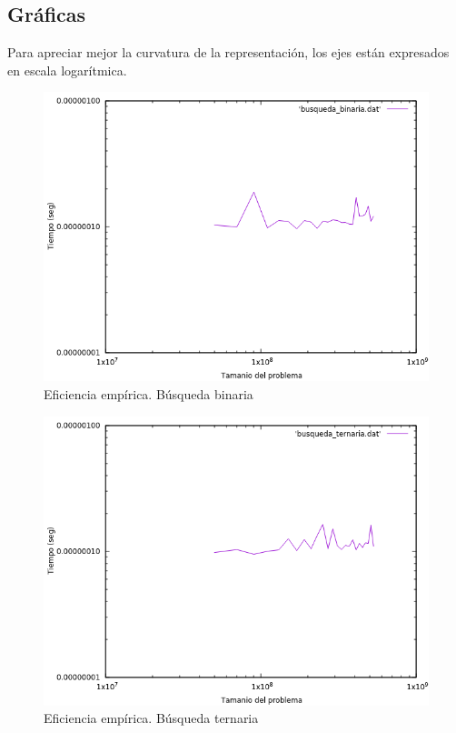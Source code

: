 \documentclass[12pt,spanish]{article}
\begin{document}
\subsection{Gráficas}
Para apreciar mejor la curvatura de la representación, los ejes están expresados en escala logarítmica.
\begin{figure}[H]
\centering
\includegraphics[scale=0.75]{empirica_binaria.png}
\caption{Eficiencia empírica. Búsqueda binaria}
\end{figure}

\begin{figure}[H]
\centering
\includegraphics[scale=0.75]{empirica_ternaria.png}
\caption{Eficiencia empírica. Búsqueda ternaria}
\end{figure}
\end{document}
